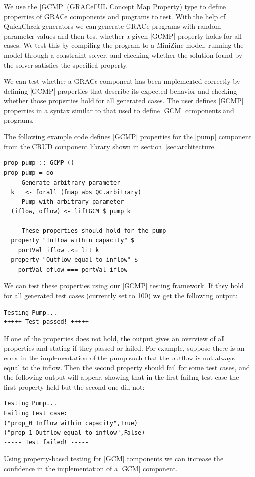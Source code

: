 \documentclass{article}
\begin{document}
We use the |GCMP| (GRACeFUL Concept Map Property) type to define properties of
GRACe components and programs to test.
%
With the help of QuickCheck generators we can generate GRACe programs with
random parameter values and then test whether a given |GCMP| property holds for all
cases.
%
We test this by compiling the program to a MiniZinc model, running the model through
a constraint solver, and checking whether the solution found by the solver
satisfies the specified property.

We can test whether a GRACe component has been implemented correctly
by defining |GCMP| properties that describe its expected behavior and checking whether
those properties hold for all generated cases.
%
The user defines |GCMP| properties in a syntax similar to that used to define |GCM|
components and programs.

The following example code defines |GCMP| properties for the |pump| component from
the CRUD component library shown in section~\ref{sec:architecture}.
\begin{verbatim}
prop_pump :: GCMP ()
prop_pump = do
  -- Generate arbitrary parameter
  k   <- forall (fmap abs QC.arbitrary)
  -- Pump with arbitrary parameter
  (iflow, oflow) <- liftGCM $ pump k

  -- These properties should hold for the pump
  property "Inflow within capacity" $
    portVal iflow .<= lit k
  property "Outflow equal to inflow" $
    portVal oflow === portVal iflow
\end{verbatim}

We can test these properties using our |GCMP| testing framework. If they hold for all
generated test cases (currently set to 100) we get the following output:
\begin{verbatim}
Testing Pump...
+++++ Test passed! +++++
\end{verbatim}

If one of the properties does not hold, the output gives an overview of all
properties and stating if they passed or failed.
%
For example, suppose there is an error in the implementation of the pump such
that the outflow is not always equal to the inflow. Then the second property
should fail for some test cases, and the following output will appear, showing
that in the first failing test case the first property held but the second one
did not:
\begin{verbatim}
Testing Pump...
Failing test case:
("prop_0 Inflow within capacity",True)
("prop_1 Outflow equal to inflow",False)
----- Test failed! -----
\end{verbatim}
Using property-based testing for |GCM| components we can increase the confidence
in the implementation of a |GCM| component.
\end{document}
